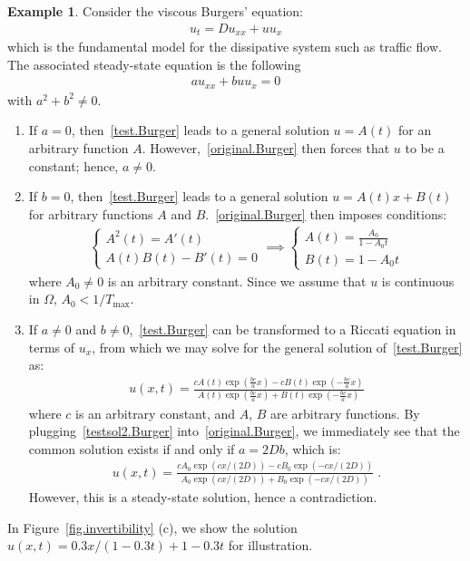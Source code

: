 \documentclass[a4paper,11pt]{article}
\theoremstyle{definition}
\newtheorem{example}{Example}[section]
\begin{document}
\begin{example}
Consider the viscous Burgers' equation:
\begin{align}
u_t=Du_{xx}+uu_x  \label{original.Burger}	
\end{align}
which is the fundamental model for the dissipative system such as traffic flow. The associated steady-state equation   is the following
\begin{align}
au_{xx}+buu_{x}=0\label{test.Burger}	
\end{align}
with $a^2+b^2\neq 0$.
\begin{enumerate}
\item If $a = 0$, then~\eqref{test.Burger} leads to a general solution $u=A(t)$ for an arbitrary function $A$. However,~\eqref{original.Burger} then forces that $u$ to be a constant; hence, $a\neq 0$.
\item If $b = 0$, then~\eqref{test.Burger} leads to a general solution $u=A(t)x+B(t)$ for  arbitrary functions $A$  and $B$.~\eqref{original.Burger} then imposes conditions:
\begin{align*}
\begin{cases}
A^2(t)=A'(t)\\
A(t)B(t)-B'(t)=0
\end{cases}	\implies\begin{cases}
A(t)=\frac{A_0}{1-A_0t}\\
B(t)=1-A_0t
\end{cases}
\end{align*}
where $A_0\neq 0$ is an arbitrary constant. Since we assume that $u$ is continuous in $\Omega$, $A_0<1/T_{\max}$.
\item If $a\neq 0$ and $b\neq 0$,~\eqref{test.Burger} can be transformed to a Riccati equation in terms of $u_x$, from which we may solve for the general solution of~\eqref{test.Burger} as:
\begin{align}
u(x,t)=	\frac{cA(t)\exp(\frac{bc}{a}x)-cB(t)\exp(-\frac{bc}{a}x)}{A(t)\exp(\frac{bc}{a}x)+B(t)\exp(-\frac{bc}{a}x)}\label{testsol2.Burger}
\end{align}
where $c$ is an arbitrary constant, and $A$, $B$ are arbitrary functions. By plugging~\eqref{testsol2.Burger} into~\eqref{original.Burger}, we immediately see that the common solution exists if and only if $a=2Db$, which is:
\begin{align*}
u(x,t) = \frac{cA_0\exp(cx/(2D))-cB_0\exp(-cx/(2D))}{A_0\exp(cx/(2D))+B_0\exp(-cx/(2D))}\;.	
\end{align*}
However, this is a steady-state  solution, hence a contradiction.
\end{enumerate}
In Figure~\ref{fig.invertibility} (c), we show the solution $u(x,t)=0.3x/(1-0.3t)+1-0.3t$ for illustration.
\end{example}
\end{document}
